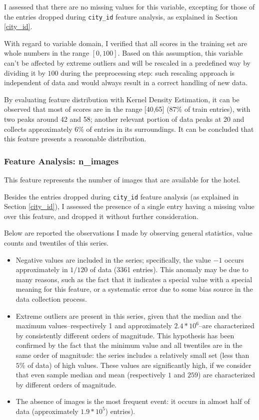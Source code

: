 \documentclass[preprint,12pt,3p]{elsarticle}
\begin{document}
I assessed that there are no missing values for this variable, excepting for those of the entries dropped during \verb|city_id| feature analysis, as explained in Section \ref{city_id}.

With regard to variable domain, I verified that all scores in the training set are whole numbers in the range $[0,100]$. Based on this assumption, this variable can't be affected by extreme outliers and will be rescaled in a predefined way by dividing it by $100$ during the preprocessing step: such rescaling approach is independent of data and would always result in a correct handling of new data.

By evaluating feature distribution with Kernel Density Estimation, it can be observed that most of scores are in the range [40,65] (87\% of train entries), with two peaks around 42 and 58; another relevant portion of data peaks at 20 and collects approximately 6\% of entries in its surroundings. It can be concluded that this feature presents a reasonable distribution.

\subsubsection{Feature Analysis: n\_images}
\label{n_images}
This feature represents the number of images that are available for the hotel.

Besides the entries dropped during \verb|city_id| feature analysis (as explained in Section \ref{city_id}), I assessed the presence of a single entry having a missing value over this feature, and dropped it without further consideration.

Below are reported the observations I made by observing general statistics, value counts and twentiles of this series.
\begin{itemize}
	\item Negative values are included in the series; specifically, the value $-1$ occurs approximately in $1/120$ of data (3361 entries). This anomaly may be due to many reasons, such as the fact that it indicates a special value with a special meaning for this feature, or a systematic error due to some bias source in the data collection process.
	\item Extreme outliers are present in this series, given that the median and the maximum values--respectively 1 and approximately $2.4*10^6$--are characterized by consistently different orders of magnitude. This hypothesis has been confirmed by the fact that the minimum value and all twentiles are in the same order of magnitude: the series includes a relatively small set (less than $5\%$ of data) of high values. These values are significantly high, if we consider that even sample median and mean (respectively $1$ and $259$) are characterized by different orders of magnitude.
	\item The absence of images is the most frequent event: it occurs in almost half of data (approximately $1.9*10^5$) entries).
\end{itemize}
\end{document}
